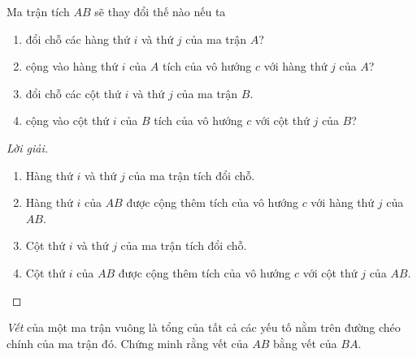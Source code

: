 \documentclass[class=linearalgebra,crop=false]{standalone}
\begin{document}
\begin{exercise}
    Ma trận tích $AB$ sẽ thay đổi thế nào nếu ta
    \begin{enumerate}[label = (\alph*)]
        \item đổi chỗ các hàng thứ $i$ và thứ $j$ của ma trận $A$?
        \item cộng vào hàng thứ $i$ của $A$ tích của vô hướng $c$ với hàng thứ $j$ của $A$?
        \item đổi chỗ các cột thứ $i$ và thứ $j$ của ma trận $B$.
        \item cộng vào cột thứ $i$ của $B$ tích của vô hướng $c$ với cột thứ $j$ của $B$?
    \end{enumerate}
\end{exercise}

\begin{proof}[Lời giải]
    \begin{enumerate}[label = (\alph*)]
        \item Hàng thứ $i$ và thứ $j$ của ma trận tích đổi chỗ.
        \item Hàng thứ $i$ của $AB$ được cộng thêm tích của vô hướng $c$ với hàng thứ $j$ của $AB$.
        \item Cột thứ $i$ và thứ $j$ của ma trận tích đổi chỗ.
        \item Cột thứ $i$ của $AB$ được cộng thêm tích của vô hướng $c$ với cột thứ $j$ của $AB$.
    \end{enumerate}
\end{proof}

\begin{exercise}\label{trace-of-products}
    \textit{Vết} của một ma trận vuông là tổng của tất cả các yếu tố nằm trên đường chéo chính của ma trận đó. Chứng minh rằng vết của $AB$ bằng vết của $BA$.
\end{exercise}
\end{document}
